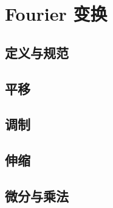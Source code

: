 \section{Fourier 变换}
\label{b2:sec:0301}


\subsection{定义与规范}
\label{b2:subsec:030101}

\subsection{平移}
\label{b2:subsec:030102}

\subsection{调制}
\label{b2:subsec:030103}

\subsection{伸缩}
\label{b2:subsec:030104}

\subsection{微分与乘法}
\label{b2:subsec:030105}



